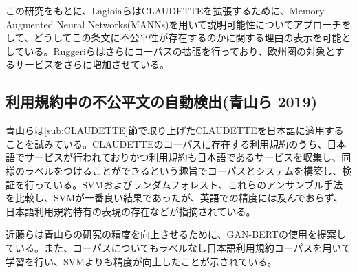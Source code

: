 この研究をもとに、Lagioiaら\cites{Lagioia2019}はCLAUDETTEを拡張するために、Memory Augmented Neural Networks(MANNs)\cites{arxiv.1410.3916}\cites{arxiv.1410.5401}を用いて説明可能性についてアプローチをして、どうしてこの条文に不公平性が存在するのかに関する理由の表示を可能としている。Ruggeriら\cites{Ruggeri_2021}はさらにコーパスの拡張を行っており、欧州圏の対象とするサービスをさらに増加させている。

\subsection{利用規約中の不公平文の自動検出(青山ら 2019)}
青山ら\cites{weko_199608_1}は\ref{sub:CLAUDETTE}節で取り上げたCLAUDETTEを日本語に適用することを試みている。CLAUDETTEのコーパスに存在する利用規約のうち、日本語でサービスが行われておりかつ利用規約も日本語であるサービスを収集し、同様のラベルをつけることができるという趣旨でコーパスとシステムを構築し、検証を行っている。SVMおよびランダムフォレスト、これらのアンサンブル手法を比較し、SVMが一番良い結果であったが、英語での精度には及んでおらず、日本語利用規約特有の表現の存在などが指摘されている。

近藤ら\cites{近藤2021}は青山らの研究の精度を向上させるために、GAN-BERT\cites{croce-etal-2020-gan}の使用を提案している。また、コーパスについてもラベルなし日本語利用規約コーパスを用いて学習を行い、SVMよりも精度が向上したことが示されている。


